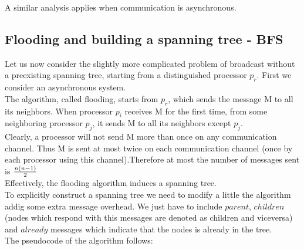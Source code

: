 \documentclass{article}
\begin{document}
A similar analysis applies when communication is asynchronous. 



\subsection{Flooding and building a spanning tree - BFS}
Let us now consider the slightly more complicated problem of broadcast 
without a preexisting spanning tree, starting from a distinguished processor $p_r$. First 
we consider an asynchronous system. \\
The algorithm, called flooding, starts from $p_r$, which sends the message M to all 
its neighbors. When processor $p_i$ receives M for the first time, from some neighboring processor $p_j$, it sends M to all its 
neighbors except $p_j$.\\
Clearly, a processor will not send M more than once on any communication 
channel. Thus M is sent at most twice on each communication channel (once 
by each processor using this channel).Therefore at most the number of messages sent is ${n(n-1) \over 2}$\\
Effectively, the flooding algorithm induces a spanning tree.\\
To explicitly construct a spanning tree we need to modify a little the algorithm addig some extra message overhead. We just have to include $parent$, $children$ (nodes which respond with this messages are denoted as children and viceversa)  and $already$ messages which indicate that the nodes is already in the tree.\\

The pseudocode of the algorithm follows:
\end{document}
